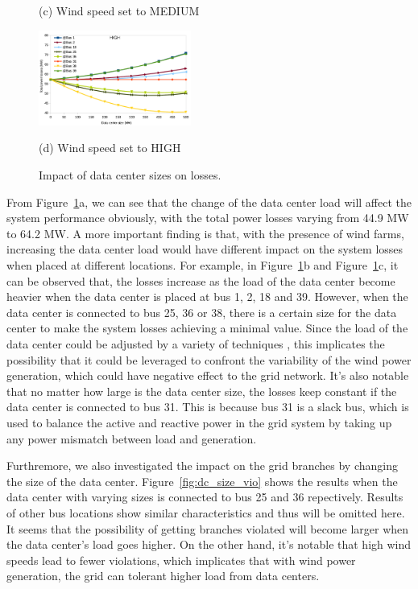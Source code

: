 \begin{figure}[ht]
\begin{minipage}{0.2\linewidth}
  \centerline{(c) Wind speed set to MEDIUM}
  \label{fig:c:medium}
\end{minipage}
\hfill
\begin{minipage}{0.2\linewidth}
  \centerline{\includegraphics[width=5.0cm]{img/size-loss-high}}
  \centerline{(d) Wind speed set to HIGH}
  \label{fig:d:high}
\end{minipage}
\caption{Impact of data center sizes on losses.}
\label{fig:dc_size_loss}
\end{figure}

From Figure~\ref{fig:dc_size_loss}a, we can see that the change of the data center load will affect the system performance obviously, with the total power losses varying from 44.9 MW to 64.2 MW. A more important finding is that, with the presence of wind farms, increasing the data center load would have different impact on the system losses when placed at different locations. For example, in Figure~\ref{fig:dc_size_loss}b and Figure~\ref{fig:dc_size_loss}c, it can be observed that, the losses increase as the load of the data center become heavier when the data center is placed at bus 1, 2, 18 and 39. However, when the data center is connected to bus 25, 36 or 38, there is a certain size for the data center to make the system losses achieving a minimal value. Since the load of the data center could be adjusted by a variety of techniques \cite{}, this implicates the possibility that it could be leveraged to confront the variability of the wind power generation, which could have negative effect to the grid network. It's also notable that no matter how large is the data center size, the losses keep constant if the data center is connected to bus 31. This is because bus 31 is a slack bus, which is used to balance the active and reactive power in the grid system by taking up any power mismatch between load and generation.

Furthremore, we also investigated the impact on the grid branches by changing the size of the data center. Figure~\ref{fig:dc_size_vio} shows the results when the data center with varying sizes is connected to bus 25 and 36 repectively. Results of other bus locations show similar characteristics and thus will be omitted here. It seems that the possibility of getting branches violated will become larger when the data center's load goes higher. On the other hand, it's notable that high wind speeds lead to fewer violations, which implicates that with wind power generation, the grid can tolerant higher load from data centers.


